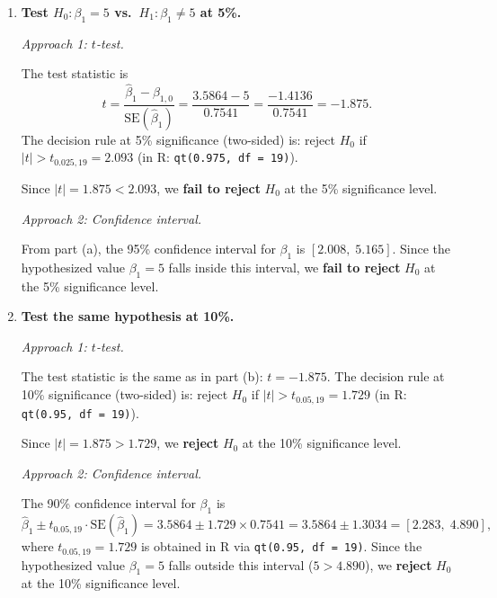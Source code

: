 \documentclass[12pt]{article}
\begin{document}
\begin{enumerate}
\begin{enumerate}
\bigskip

\item \textbf{Test $H_0\colon \beta_1 = 5$ vs.\ $H_1\colon \beta_1 \ne 5$ at 5\%.}

\textit{Approach 1: $t$-test.}

The test statistic is
$$
t = \frac{\hat{\beta}_1 - \beta_{1,0}}{\text{SE}(\hat{\beta}_1)} = \frac{3.5864 - 5}{0.7541} = \frac{-1.4136}{0.7541} = -1.875.
$$
The decision rule at 5\% significance (two-sided) is: reject $H_0$ if $|t| > t_{0.025, 19} = 2.093$ (in R: \verb!qt(0.975, df = 19)!).

Since $|t| = 1.875 < 2.093$, we \textbf{fail to reject} $H_0$ at the 5\% significance level.

\bigskip

\textit{Approach 2: Confidence interval.}

From part (a), the 95\% confidence interval for $\beta_1$ is $[2.008,\; 5.165]$. Since the hypothesized value $\beta_1 = 5$ falls inside this interval, we \textbf{fail to reject} $H_0$ at the 5\% significance level.

\bigskip

\item \textbf{Test the same hypothesis at 10\%.}

\textit{Approach 1: $t$-test.}

The test statistic is the same as in part (b): $t = -1.875$. The decision rule at 10\% significance (two-sided) is: reject $H_0$ if $|t| > t_{0.05, 19} = 1.729$ (in R: \verb!qt(0.95, df = 19)!).

Since $|t| = 1.875 > 1.729$, we \textbf{reject} $H_0$ at the 10\% significance level.

\bigskip

\textit{Approach 2: Confidence interval.}

The 90\% confidence interval for $\beta_1$ is
$$
\hat{\beta}_1 \pm t_{0.05, 19} \cdot \text{SE}(\hat{\beta}_1) = 3.5864 \pm 1.729 \times 0.7541 = 3.5864 \pm 1.3034 = [2.283,\; 4.890],
$$
where $t_{0.05, 19} = 1.729$ is obtained in R via \verb!qt(0.95, df = 19)!. Since the hypothesized value $\beta_1 = 5$ falls outside this interval ($5 > 4.890$), we \textbf{reject} $H_0$ at the 10\% significance level.

\end{enumerate}

\bigskip



\end{enumerate}
\end{document}
